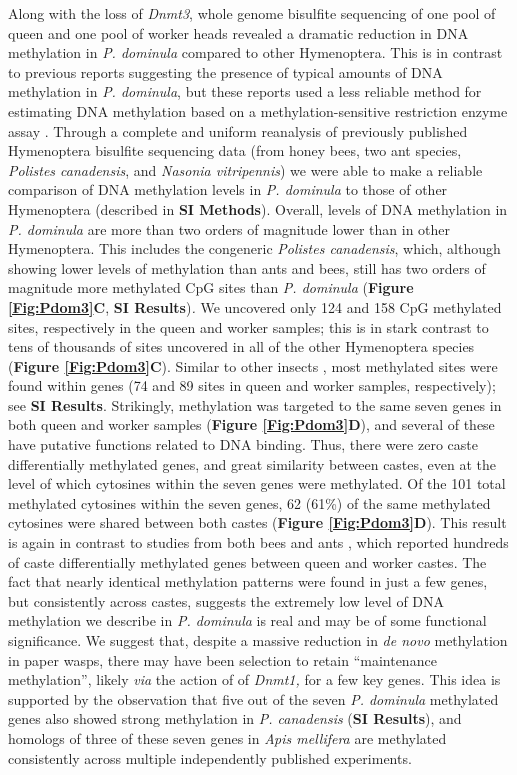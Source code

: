 Along with the loss of \textit{Dnmt3}, whole genome bisulfite sequencing
of one pool of queen and one pool of worker heads revealed a dramatic
reduction in DNA methylation in \textit{P. dominula} compared to other
Hymenoptera. This is in contrast to previous reports suggesting the
presence of typical amounts of DNA methylation in \textit{P. dominula},
but these reports used a less reliable method for estimating DNA
methylation based on a methylation-sensitive restriction enzyme assay
\cite{Kronforst2008,Weiner2013}. Through
a complete and uniform reanalysis of previously published Hymenoptera
bisulfite sequencing data (from honey bees, two ant species,
\textit{Polistes canadensis}, and \textit{Nasonia vitripennis}) we were able
to make a reliable comparison of DNA methylation levels in \textit{P.
dominula} to those of other Hymenoptera (described in \textbf{SI
Methods}). Overall, levels of DNA methylation in \textit{P. dominula} are
more than two orders of magnitude lower than in other Hymenoptera. This
includes the congeneric \textit{Polistes canadensis}, which, although
showing lower levels of methylation than ants and bees, still has two
orders of magnitude more methylated CpG sites than \textit{P. dominula}
(\textbf{Figure \ref{Fig:Pdom3}C}, \textbf{SI Results})\textit{.} We uncovered only 124
and 158 CpG methylated sites, respectively in the queen and worker
samples; this is in stark contrast to tens of thousands of sites
uncovered in all of the other Hymenoptera species (\textbf{Figure \ref{Fig:Pdom3}C}).
Similar to other insects \cite{Rasmussen2015}, most methylated sites were found within genes (74 and
89 sites in queen and worker samples, respectively); see \textbf{SI
Results}. Strikingly, methylation was targeted to the same seven genes
in both queen and worker samples (\textbf{Figure \ref{Fig:Pdom3}D}), and several of
these have putative functions related to DNA binding. Thus, there were
zero caste differentially methylated genes, and great similarity between
castes, even at the level of which cytosines within the seven genes were
methylated. Of the 101 total methylated cytosines within the seven
genes, 62 (61\%) of the same methylated cytosines were shared between
both castes (\textbf{Figure \ref{Fig:Pdom3}D}). This result is again in contrast to
studies from both bees \cite{Lyko2010} and ants \cite{Bonasio2012}, which
reported hundreds of caste differentially methylated genes between queen
and worker castes. The fact that nearly identical methylation patterns
were found in just a few genes, but consistently across castes, suggests
the extremely low level of DNA methylation we describe in \textit{P.
dominula} is real and may be of some functional significance. We suggest
that, despite a massive reduction in \textit{de novo} methylation in paper
wasps, there may have been selection to retain ``maintenance
methylation'', likely \textit{via} the action of of \textit{Dnmt1,} for a
few key genes. This idea is supported by the observation that five out
of the seven \textit{P. dominula} methylated genes also showed strong
methylation in \textit{P. canadensis} (\textbf{SI Results}), and homologs
of three of these seven genes in \textit{Apis mellifera} are methylated
consistently across multiple independently published experiments.

